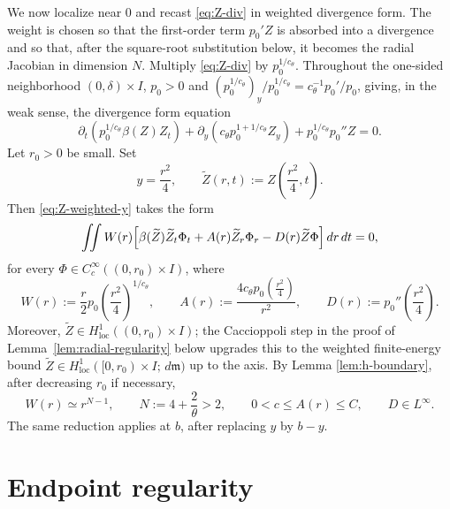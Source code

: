 \documentclass[11pt]{amsart}
\newcommand{\dd}{\,d}
\newcommand{\loc}{\mathrm{loc}}
\begin{document}
We now localize near \(0\) and recast \eqref{eq:Z-div} in weighted divergence
form. The weight is chosen so that the first-order term \(p_0'Z\) is absorbed
into a divergence and so that, after the square-root substitution below, it
becomes the radial Jacobian in dimension \(N\). Multiply \eqref{eq:Z-div} by
\(p_0^{1/c_\theta}\). Throughout the one-sided neighborhood \((0,\delta)\times I\),
\(p_0>0\) and
\((p_0^{1/c_\theta})_y/p_0^{1/c_\theta}=c_\theta^{-1}p_0'/p_0\), giving, in
the weak sense, the divergence form equation
\begin{equation}
\label{eq:Z-weighted-y}
        \partial_t\!\left(p_0^{1/c_\theta}\beta(Z)Z_t\right)
        +\partial_y\!\left(c_\theta p_0^{1+1/c_\theta}Z_y\right)
        +p_0^{1/c_\theta}p_0''Z=0 .
\end{equation}
Let \(r_0>0\) be small. Set
\[
        y=\frac{r^2}{4},\qquad \widetilde Z(r,t):=Z\!\left(\frac{r^2}{4},t\right).
\]
Then \eqref{eq:Z-weighted-y} takes the form
\begin{equation}
\label{eq:radial-weak}
        \iint W(r)\Bigl[
        \beta(\widetilde Z)\widetilde Z_t\Phi_t+A(r)\widetilde Z_r\Phi_r-D(r)\widetilde Z\Phi
        \Bigr]\dd r\dd t=0 ,
\end{equation}
for every \(\Phi\in C_c^\infty((0,r_0)\times I)\), where
\begin{equation*}
        W(r):=\frac r2p_0\!\left(\frac{r^2}{4}\right)^{1/c_\theta},\qquad
        A(r):=\frac{4c_\theta p_0\!\left(\frac{r^2}{4}\right)}{r^2},\qquad
        D(r):=p_0''\!\left(\frac{r^2}{4}\right).
\end{equation*}
Moreover, \(\widetilde Z\in H^1_{\loc}((0,r_0)\times I)\); the
Caccioppoli step in the proof of Lemma~\ref{lem:radial-regularity} below
upgrades this to the weighted finite-energy bound
\(\widetilde Z\in H^1_{\loc}([0,r_0)\times I;\dd\mathfrak m)\) up to the
axis. By Lemma \ref{lem:h-boundary}, after decreasing \(r_0\) if
necessary,
\begin{equation}
\label{eq:radial-structure}
        W(r)\simeq r^{N-1},\qquad
        N:=4+\frac2\theta>2,\qquad
        0<c\le A(r)\le C,\qquad
        D\in L^\infty .
\end{equation}
The same reduction applies at \(b\), after replacing \(y\) by \(b-y\).

\section{Endpoint regularity}
\label{sec:endpoint-regularity}
\end{document}
